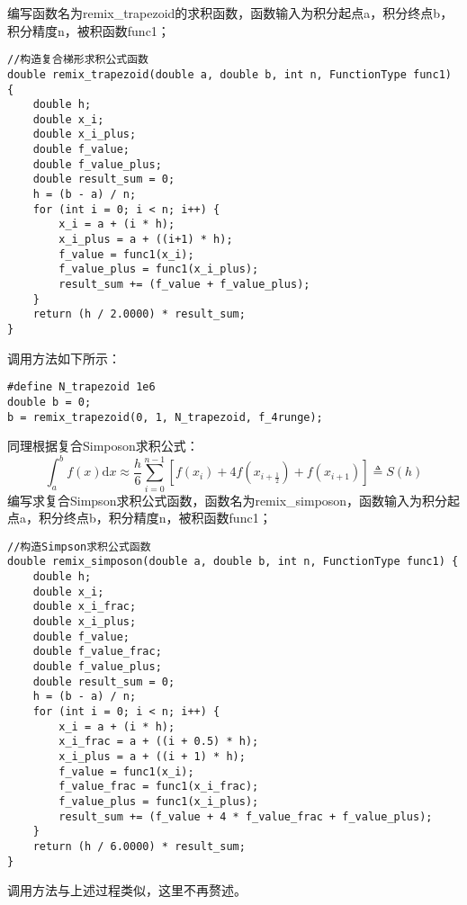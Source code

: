 \documentclass{homework}
\begin{document}
编写函数名为remix\_trapezoid的求积函数，函数输入为积分起点a，积分终点b，积分精度n，被积函数func1；

\begin{lstlisting}
//构造复合梯形求积公式函数
double remix_trapezoid(double a, double b, int n, FunctionType func1) {
    double h;
    double x_i;
    double x_i_plus;
    double f_value;
    double f_value_plus;
    double result_sum = 0;
    h = (b - a) / n;
    for (int i = 0; i < n; i++) {
        x_i = a + (i * h); 
        x_i_plus = a + ((i+1) * h); 
        f_value = func1(x_i);
        f_value_plus = func1(x_i_plus);
        result_sum += (f_value + f_value_plus);
    }
    return (h / 2.0000) * result_sum;
}
\end{lstlisting}

调用方法如下所示：
\begin{lstlisting}
#define N_trapezoid 1e6
double b = 0;
b = remix_trapezoid(0, 1, N_trapezoid, f_4runge);
\end{lstlisting}

同理根据复合Simposon求积公式：
\begin{equation}
    \int_a^bf(x)\mathrm{d}x\approx \frac{h}{6}\sum_{i=0}^{n-1}\left[f(x_i)+4f(x_{i+\frac{1}{2}})+f(x_{i+1})\right]\triangleq S(h)
\end{equation}
编写求复合Simpson求积公式函数，函数名为remix\_simposon，函数输入为积分起点a，积分终点b，积分精度n，被积函数func1；
\begin{lstlisting}
//构造Simpson求积公式函数
double remix_simposon(double a, double b, int n, FunctionType func1) {
    double h;
    double x_i;
    double x_i_frac;
    double x_i_plus;
    double f_value;
    double f_value_frac;
    double f_value_plus;
    double result_sum = 0;
    h = (b - a) / n;
    for (int i = 0; i < n; i++) {
        x_i = a + (i * h); 
        x_i_frac = a + ((i + 0.5) * h);
        x_i_plus = a + ((i + 1) * h); 
        f_value = func1(x_i);
        f_value_frac = func1(x_i_frac);
        f_value_plus = func1(x_i_plus);
        result_sum += (f_value + 4 * f_value_frac + f_value_plus);
    }
    return (h / 6.0000) * result_sum;
}
\end{lstlisting}

调用方法与上述过程类似，这里不再赘述。
\end{document}
